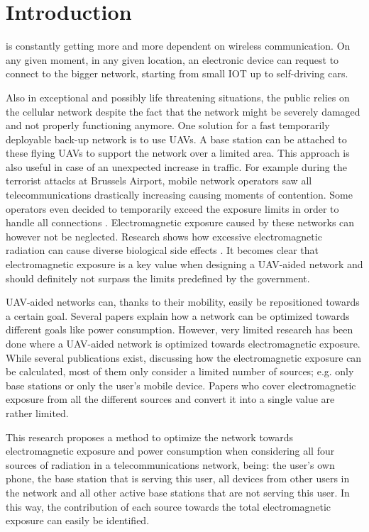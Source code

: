 \documentclass[twocolumn]{phdsymp} %
\begin{document}
\section{Introduction}
 is constantly getting more and more dependent on wireless communication. 
On any given moment, in any given location, an electronic device
can request to connect to the bigger network, 
starting from small \gls{IOT} up to self-driving cars.

Also in exceptional and possibly life threatening situations, the public relies on the cellular network
despite the fact that the network might be severely damaged and not properly functioning anymore.
One solution for a fast temporarily deployable back-up network is to use \gls{UAV}s. A base station can be attached to 
these flying \gls{UAV}s to support the network over a limited area. 
This approach is also useful in case of an unexpected increase in traffic. 
For example during the terrorist attacks at Brussels Airport,
mobile network operators saw all telecommunications drastically increasing causing moments of contention. 
Some operators even decided to temporarily exceed the exposure limits in
order to handle all connections \cite{baseZaventem}.
Electromagnetic exposure caused by these networks can however not be neglected. 
Research shows how excessive electromagnetic radiation can cause diverse biological side effects \cite{bioeffects,WHO}.
It becomes clear that electromagnetic exposure is a key value when designing a \gls{UAV}-aided network and should definitely 
not surpass the limits predefined by the government.

\gls{UAV}-aided networks can, thanks to their mobility, easily be repositioned towards a certain goal. Several papers 
explain how a network can be optimized towards different goals like power consumption.
However, very limited
research has been done where a \gls{UAV}-aided network is optimized towards electromagnetic exposure.
While several publications exist, discussing how the electromagnetic exposure can be calculated, 
most of them only consider a limited number of sources; e.g. only base stations or only the user's mobile device.
Papers who cover electromagnetic exposure from all the different sources and convert it into a single value are rather limited.

This research proposes a method to optimize the network towards electromagnetic exposure and power consumption
when considering all four sources of radiation in a telecommunications network, being: the user's own phone,
 the base station that is serving this user, 
all devices from other users in the network and all 
other active base stations that are not serving this user. In this way, the contribution of each source towards the total 
electromagnetic exposure can easily be identified. 
\end{document}
